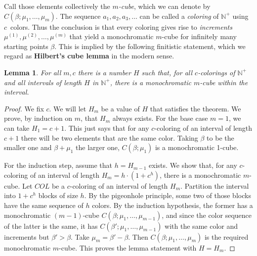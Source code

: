 \documentclass{article}
\theoremstyle{plain}
\newtheorem{lemma}[thm]{Lemma}
\theoremstyle{definition}
\newcommand{\Nat}{\mathbb{N}}   %
\begin{document}
\begin{center}
\end{center}



\noindent
Call those elements collectively the \emph{$m$-cube}, which we can
denote by $C(\beta;\mu_1,\dots,\mu_m)$. The sequence
$a_1,a_2,a_3,\dots$ can be called a \emph{coloring} of $\Nat^+$ using
$c$~colors. Thus the conclusion is that every coloring gives rise to
\emph{increments} $\mu^{(1)},\mu^{(2)},\dots,\mu^{(m)}$ that yield a
monochromatic $m$-cube for infinitely many starting points $\beta$.
This is implied by the following finitistic statement, which we regard
as \textbf{Hilbert's cube lemma} in the modern sense.


\begin{lemma} 
\label{le:cube}
For all $m,c$ there is a number $H$ such that, for all $c$-colorings
of $\Nat^+$ and all intervals of length $H$ in $\Nat^+$, there is a
monochromatic $m$-cube within the interval.
\end{lemma}




\begin{proof}
We fix $c$. We will let $H_m$ be a value of $H$ that satisfies the theorem.
We prove, by induction on $m$, that $H_m$ always exists.
For the base case $m = 1$, we can
take $H_1 = c + 1$. This just says that for any $c$-coloring of an
interval of length $c + 1$ there will be two elements that are the
same color. Taking $\beta$ to be the smaller one and $\beta + \mu_1$
the larger one, $C(\beta;\mu_1)$ is a monochromatic 1-cube.

For the induction step, assume that $h = H_{m-1}$ exists. We show that, for
any $c$-coloring of an interval of length 
$H_m = h \!\cdot\! (1 + c^h)$, there is a monochromatic $m$-cube. Let
$COL$ be a $c$-coloring of an interval of length $H_m$. Partition the
interval into $1 + c^h$ blocks of size $h$. By the pigeonhole
principle, some two of those blocks have the same sequence of $h$
colors. By the induction hypothesis, the former has a monochromatic
$(m-1)$-cube $C(\beta;\mu_1,\dots,\mu_{m-1})$, and since the color
sequence of the latter is the same, it has
$C(\beta';\mu_1,\dots,\mu_{m-1})$ with the same color and increments
but $\beta' > \beta$. Take $\mu_m = \beta' - \beta$. Then
$C(\beta;\mu_1,\dots,\mu_m)$ is the required monochromatic $m$-cube.
This proves the lemma statement with $H = H_m$.
\end{proof}
\end{document}
